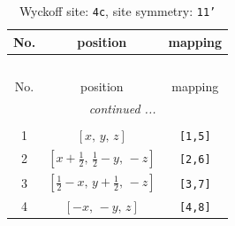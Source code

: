 \documentclass[fleqn,8pt]{jsarticle}
\begin{document}
\renewcommand{\arraystretch}{1.2}
\begin{longtable}{ccc}
\caption{Wyckoff site: {\tt 4c}, site symmetry: {\tt 11'}}
 \\
 \hline \hline
No. & position & mapping \\ \hline \endfirsthead

\multicolumn{2}{l}{\tablename\ \thetable{}} \\
 \hline \hline
No. & position & mapping \\ \hline \endhead

 \hline \hline
\multicolumn{2}{r}{\footnotesize\it continued ...} \\ \endfoot

 \hline \hline
\multicolumn{2}{r}{} \\ \endlastfoot

1 & $\left[ x,\, y,\, z \right]$ & {\tt [1,5]} \\ \hline
2 & $\left[ x + \frac{1}{2},\, \frac{1}{2} - y,\, - z \right]$ & {\tt [2,6]} \\ \hline
3 & $\left[ \frac{1}{2} - x,\, y + \frac{1}{2},\, - z \right]$ & {\tt [3,7]} \\ \hline
4 & $\left[ - x,\, - y,\, z \right]$ & {\tt [4,8]} \\
\end{longtable}
\end{document}
